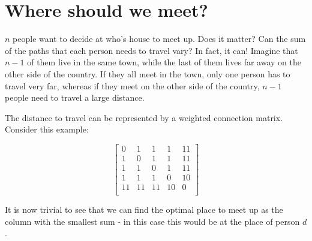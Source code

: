 \section{Where should we meet?}

$n$ people want to decide at who's house to meet up. Does it matter? Can the sum of the paths that each person needs to travel vary? In fact, it can! Imagine that $n-1$ of them live in the same town, while the last of them lives far away on the other side of the country. If they all meet in the town, only one person has to travel very far, whereas if they meet on the other side of the country, $n-1$ people need to travel a large distance.


The distance to travel can be represented by a weighted connection matrix. Consider this example:

$$
\begin{bmatrix}
    0 &  1 &  1 &  1 &  11 \\
    1 &  0 &  1 &  1 &  11 \\
    1 &  1 &  0 &  1 &  11 \\
    1 &  1 &  1 &  0 &  10 \\
    11 & 11 & 11 & 10 & 0 \\
\end{bmatrix}
$$

It is now trivial to see that we can find the optimal place to meet up as the column with the smallest sum - in this case this would be at the place of person $d$.